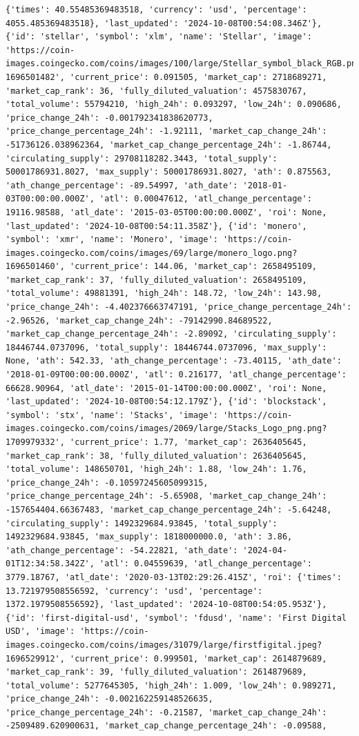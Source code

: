 \documentclass[
  letterpaper,
  DIV=11,
  numbers=noendperiod]{scrreprt}
\begin{document}
\begin{verbatim}
{'times': 40.55485369483518, 'currency': 'usd', 'percentage': 4055.485369483518}, 'last_updated': '2024-10-08T00:54:08.346Z'}, {'id': 'stellar', 'symbol': 'xlm', 'name': 'Stellar', 'image': 'https://coin-images.coingecko.com/coins/images/100/large/Stellar_symbol_black_RGB.png?1696501482', 'current_price': 0.091505, 'market_cap': 2718689271, 'market_cap_rank': 36, 'fully_diluted_valuation': 4575830767, 'total_volume': 55794210, 'high_24h': 0.093297, 'low_24h': 0.090686, 'price_change_24h': -0.001792341838620773, 'price_change_percentage_24h': -1.92111, 'market_cap_change_24h': -51736126.038962364, 'market_cap_change_percentage_24h': -1.86744, 'circulating_supply': 29708118282.3443, 'total_supply': 50001786931.8027, 'max_supply': 50001786931.8027, 'ath': 0.875563, 'ath_change_percentage': -89.54997, 'ath_date': '2018-01-03T00:00:00.000Z', 'atl': 0.00047612, 'atl_change_percentage': 19116.98588, 'atl_date': '2015-03-05T00:00:00.000Z', 'roi': None, 'last_updated': '2024-10-08T00:54:11.358Z'}, {'id': 'monero', 'symbol': 'xmr', 'name': 'Monero', 'image': 'https://coin-images.coingecko.com/coins/images/69/large/monero_logo.png?1696501460', 'current_price': 144.06, 'market_cap': 2658495109, 'market_cap_rank': 37, 'fully_diluted_valuation': 2658495109, 'total_volume': 49881391, 'high_24h': 148.72, 'low_24h': 143.98, 'price_change_24h': -4.402376663747191, 'price_change_percentage_24h': -2.96526, 'market_cap_change_24h': -79142990.84689522, 'market_cap_change_percentage_24h': -2.89092, 'circulating_supply': 18446744.0737096, 'total_supply': 18446744.0737096, 'max_supply': None, 'ath': 542.33, 'ath_change_percentage': -73.40115, 'ath_date': '2018-01-09T00:00:00.000Z', 'atl': 0.216177, 'atl_change_percentage': 66628.90964, 'atl_date': '2015-01-14T00:00:00.000Z', 'roi': None, 'last_updated': '2024-10-08T00:54:12.179Z'}, {'id': 'blockstack', 'symbol': 'stx', 'name': 'Stacks', 'image': 'https://coin-images.coingecko.com/coins/images/2069/large/Stacks_Logo_png.png?1709979332', 'current_price': 1.77, 'market_cap': 2636405645, 'market_cap_rank': 38, 'fully_diluted_valuation': 2636405645, 'total_volume': 148650701, 'high_24h': 1.88, 'low_24h': 1.76, 'price_change_24h': -0.10597245605099315, 'price_change_percentage_24h': -5.65908, 'market_cap_change_24h': -157654404.66367483, 'market_cap_change_percentage_24h': -5.64248, 'circulating_supply': 1492329684.93845, 'total_supply': 1492329684.93845, 'max_supply': 1818000000.0, 'ath': 3.86, 'ath_change_percentage': -54.22821, 'ath_date': '2024-04-01T12:34:58.342Z', 'atl': 0.04559639, 'atl_change_percentage': 3779.18767, 'atl_date': '2020-03-13T02:29:26.415Z', 'roi': {'times': 13.721979508556592, 'currency': 'usd', 'percentage': 1372.1979508556592}, 'last_updated': '2024-10-08T00:54:05.953Z'}, {'id': 'first-digital-usd', 'symbol': 'fdusd', 'name': 'First Digital USD', 'image': 'https://coin-images.coingecko.com/coins/images/31079/large/firstfigital.jpeg?1696529912', 'current_price': 0.999501, 'market_cap': 2614879689, 'market_cap_rank': 39, 'fully_diluted_valuation': 2614879689, 'total_volume': 5277645305, 'high_24h': 1.009, 'low_24h': 0.989271, 'price_change_24h': -0.002162259148526635, 'price_change_percentage_24h': -0.21587, 'market_cap_change_24h': -2509489.620900631, 'market_cap_change_percentage_24h': -0.09588, 
\end{verbatim}
\end{document}

